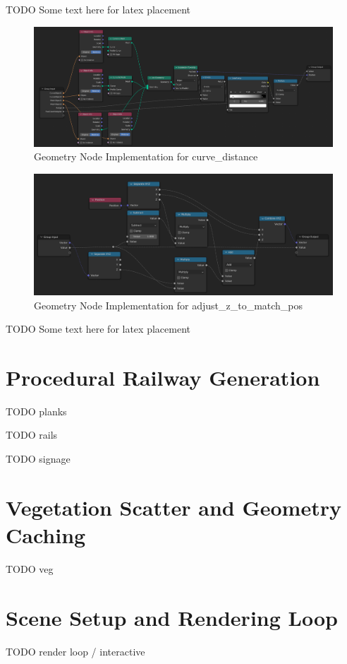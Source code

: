 TODO Some text here for latex placement


\begin{figure}[H]
    \centering
    \includegraphics[width=14.5cm]{src/img/pic/pic-3 blender geometry screenshot curve_distance.png}
    \caption{Geometry Node Implementation for curve_distance}
    \label{fig:impl-curve-dist}
\end{figure}

\begin{figure}[H]
    \centering
    \includegraphics[width=14.5cm]{src/img/pic/pic-4 blender geometry node screenshot adjust_z_to_match_pos.png}
    \caption{Geometry Node Implementation for adjust_z_to_match_pos}
    \label{fig:impl-adjust-z-to-match-pos}
\end{figure}


TODO Some text here for latex placement


\section{Procedural Railway Generation}
\label{sec:procedural-railway-generation}

TODO planks

TODO rails

TODO signage



\section{Vegetation Scatter and Geometry Caching}
\label{sec:vegetation-scatter}


TODO veg


\section{Scene Setup and Rendering Loop}
\label{sec:rendering}


TODO render loop / interactive
